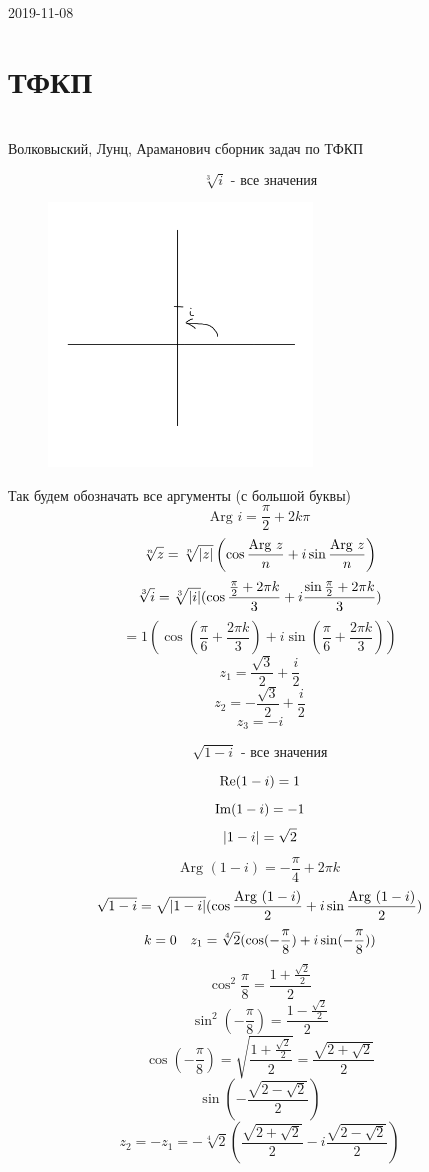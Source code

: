 \documentclass[main.tex]{subfiles}
\begin{document}
 

\begin{lect}{2019-11-08}
    \section{ТФКП}\\
    Волковыский, Лунц, Араманович \q сборник задач по ТФКП

    \begin{Task}
        \[\sqrt[3]{i} \text{ - все значения}\]

        \begin{figure}[H]
            \includegraphics[width=7cm]{pics/13}
            \centering
        \end{figure}
        Так будем обозначать все аргументы (с большой буквы)
        \[\text{Arg } i = \frac{\pi}{2} + 2k\pi\]
        \[\sqrt[n]{z} = \sqrt[n]{\left|z\right|} \left(\cos \frac{\text{Arg } z }{n} + 
        i\sin \frac{\text{Arg } z }{n}\right)\]
        \[\sqrt[3]{i} = \sqrt[3]{\left|i\right|}(\cos \frac{\frac{\pi}{2} + 2\pi k}{3} + 
        i\frac{\sin \frac{\pi}{2} + 2\pi k}{3})\]
        \[ = 1(\cos(\frac{\pi}{6} + \frac{2\pi k}{3}) + i\sin(\frac{\pi}{6} + 
        \frac{2\pi k}{3}))\]
        \[z_1 = \frac{\sqrt{3}}{2} + \frac{i}{2}\]
        \[z_2 = -\frac{\sqrt{3}}{2} + \frac{i}{2}\]
        \[z_3 = -i \]
    \end{Task}

    \begin{Task}
        \[\sqrt{1 - i} \text{ - все значения}\]

        \[\mathop{\rm Re}\nolimits (1 - i) = 1\]
        \[\mathop{\rm Im}\nolimits (1 - i) = -1\]
        \[\left|1 - i\right| = \sqrt{2}\]
        \[\text{Arg } (1 - i) = -\frac{\pi}{4} + 2\pi k\]
        \[\sqrt{1 - i} = \sqrt{\left|1 - i\right|} (\cos \frac{\text{Arg } (1 - i)}{2} + 
        i\sin \frac{\text{Arg } (1 - i)}{2})\]
        \[k = 0 \quad z_1 = \sqrt[4]{2} (\cos (-\frac{\pi}{8}) + i\sin( -\frac{\pi}{8}))\]
        \[\cos^2 \frac{\pi}{8} = \frac{1 + \frac{\sqrt{2}}{2} }{2}\]
        \[\sin^2 ( -\frac{\pi}{8}) = \frac{1 - \frac{\sqrt{2}}{2}}{2}\]
        \[\cos \left(- \frac{\pi}{8}\right) = \sqrt{\frac{1 + \frac{\sqrt{2}}{2}}{2}} = 
        \frac{\sqrt{2 + \sqrt{2}}}{2}\]
        \[\sin (-\frac{\sqrt{2 - \sqrt{2}}}{2})\]
        \[z_2 = -z_1 = -\sqrt[4]{2} \left(\frac{\sqrt{2 + \sqrt{2}}}{2} - 
        i\frac{\sqrt{2 - \sqrt{2}}}{2}\right)\]
    \end{Task}


\end{lect}
\end{document}
